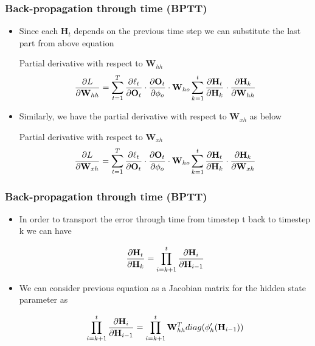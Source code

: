 \documentclass[
	11pt,
]{beamer}
\begin{document}
\begin{frame}
	\frametitle{Back-propagation through time (BPTT)}
	\begin{itemize}
		\item Since each $\mathbf{H}_t$ depends on the previous time step we can substitute the last part from above equation
	\begin{block}{Partial derivative with respect to $\mathbf{W}_{hh}$}
		\begin{equation*}
			\pdv{L}{\mathbf{W}_{hh}} = \sum_{t=1}^T \pdv{\ell_t}{\mathbf{O}_t} \cdot \pdv{\mathbf{O}_t}{\phi_o} \cdot \mathbf{W}_{ho} \sum_{k=1}^t \pdv{\mathbf{H}_t}{\mathbf{H}_k} \cdot \pdv{\mathbf{H}_k}{\mathbf{W}_{hh}}
		\end{equation*}
	\end{block}
		\item Similarly, we have the partial derivative with respect to $\mathbf{W}_{xh}$ as below
	\begin{block}{Partial derivative with respect to $\mathbf{W}_{xh}$}
		\begin{equation*}
			\pdv{L}{\mathbf{W}_{xh}} = \sum_{t=1}^T \pdv{\ell_t}{\mathbf{O}_t} \cdot \pdv{\mathbf{O}_t}{\phi_o} \cdot \mathbf{W}_{ho} \sum_{k=1}^t \pdv{\mathbf{H}_t}{\mathbf{H}_k} \cdot \pdv{\mathbf{H}_k}{\mathbf{W}_{xh}}
		\end{equation*}
	\end{block}
\end{itemize}
\end{frame}

\begin{frame}
	\frametitle{Back-propagation through time (BPTT)}
	\begin{itemize}
		\item In order to transport the error through time from timestep t back
		to timestep k we can have
	\begin{block}{}
		\begin{equation*}
			\pdv{\mathbf{H}_t}{\mathbf{H}_k} = \prod_{i = k + 1}^t \pdv{\mathbf{H}_i}{\mathbf{H}_{i-1}}
		\end{equation*}
	\end{block}
		\item We can consider previous equation as a Jacobian matrix for the hidden state parameter as
	\begin{block}{}
		\begin{equation*}
			\prod_{i = k + 1}^t \pdv{\mathbf{H}_i}{\mathbf{H}_{i-1}} = \prod_{i = k+1}^t \mathbf{W}_{hh}^T diag(\phi'_{h}(\mathbf{H}_{i-1}))
		\end{equation*}
	\end{block}
\end{itemize}
\end{frame}
\end{document}
